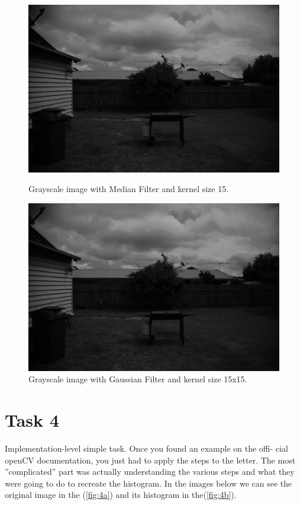 \begin{figure}[h]
	\centering
	\begin{minipage}{0.45\textwidth}
		\centering
		\includegraphics[width=\linewidth]{images/source/task3/median_5}
		\caption{Grayscale image with Median Filter and kernel size 15.}
		\label{fig:3a}
        \end{minipage}
        \hspace{0.05\textwidth}
        \begin{minipage}{0.45\textwidth}
        		\centering
		\includegraphics[width=\linewidth]{images/source/task3/gaussian_5}
		\caption{Grayscale image with Gaussian Filter and kernel size 15x15.}
		\label{fig:3b}
        \end{minipage}
\end{figure}


\chapter{Task 4}
Implementation-level simple task. Once you found an example on the offi- cial openCV documentation, you just had to apply the steps to the letter. The most ”complicated” part was actually understanding the various steps and what they were going to do to recreate the histogram. In the images below we can see the original image in the (\ref{fig:4a}) and its histogram in the(\ref{fig:4b}).

